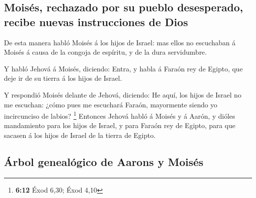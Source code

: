\hypertarget{moisuxe9s-rechazado-por-su-pueblo-desesperado-recibe-nuevas-instrucciones-de-dios}{%
\subsection{Moisés, rechazado por su pueblo desesperado, recibe nuevas
instrucciones de
Dios}\label{moisuxe9s-rechazado-por-su-pueblo-desesperado-recibe-nuevas-instrucciones-de-dios}}

 De esta manera habló Moisés á los hijos de Israel: mas
ellos no escuchaban á Moisés á causa de la congoja de espíritu, y de la
dura servidumbre.

 Y habló Jehová á Moisés, diciendo:  Entra, y
habla á Faraón rey de Egipto, que deje ir de su tierra á los hijos de
Israel.

 Y respondió Moisés delante de Jehová, diciendo: He aquí,
los hijos de Israel no me escuchan: ¿cómo pues me escuchará Faraón,
mayormente siendo yo incircunciso de labios? \footnote{\textbf{6:12}
  Éxod 6,30; Éxod 4,10}  Entonces Jehová habló á Moisés y á
Aarón, y dióles mandamiento para los hijos de Israel, y para Faraón rey
de Egipto, para que sacasen á los hijos de Israel de la tierra de
Egipto.

\hypertarget{uxe1rbol-genealuxf3gico-de-aarons-y-moisuxe9s}{%
\subsection{Árbol genealógico de Aarons y
Moisés}\label{uxe1rbol-genealuxf3gico-de-aarons-y-moisuxe9s}}

